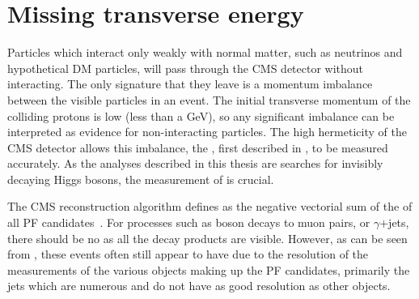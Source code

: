 {\section{Missing transverse energy}
\label{sec:MET}
Particles which interact only weakly with normal matter, such as neutrinos and hypothetical \ac{DM} particles, will pass through the CMS detector without interacting. The only signature that they leave is a momentum imbalance between the visible particles in an event. The initial transverse momentum of the colliding protons is low (less than a \ac{GeV}), so any significant imbalance can be interpreted as evidence for non-interacting particles. The high hermeticity of the CMS detector allows this imbalance, the \MET, first described in , to be measured accurately. As the analyses described in this thesis are searches for invisibly decaying Higgs bosons, the measurement of \MET is crucial.

The CMS \MET reconstruction algorithm defines \MET as the negative vectorial sum of the \pt of all \ac{PF} candidates~\cite{CMS-PAS-JME-12-002}. For processes such as \PZ boson decays to muon pairs, or $\gamma$+jets, there should be no \MET as all the decay products are visible. However, as can be seen from , these events often still appear to have \MET due to the resolution of the \pt measurements of the various objects making up the \ac{PF} candidates, primarily the jets which are numerous and do not have as good resolution as other objects.

}
